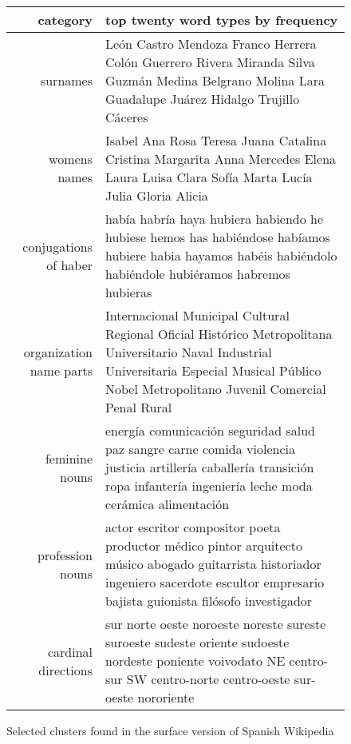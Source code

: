 \begin{figure*}[t!]
  \begin{tabular}{|r|p{10cm}|}
    \hline
    category  & top twenty word types by frequency \\
    \hline
    surnames & León Castro Mendoza Franco Herrera Colón Guerrero Rivera Miranda
    Silva Guzmán Medina Belgrano Molina Lara Guadalupe Juárez Hidalgo Trujillo
    Cáceres \\
    \hline
    womens names & Isabel Ana Rosa Teresa Juana Catalina Cristina Margarita
    Anna Mercedes Elena Laura Luisa Clara Sofía Marta Lucía Julia Gloria Alicia
    \\
    \hline
    conjugations of haber & había habría haya hubiera habiendo he hubiese hemos
    has habiéndose habíamos hubiere habia hayamos habéis habiéndolo habiéndole
    hubiéramos habremos hubieras \\
    \hline
    organization name parts & Internacional Municipal Cultural Regional
    Oficial Histórico Metropolitana Universitario Naval Industrial
    Universitaria Especial Musical Público Nobel Metropolitano Juvenil
    Comercial Penal Rural \\
    \hline
    feminine nouns & energía comunicación seguridad salud paz sangre carne
    comida violencia justicia artillería caballería transición ropa infantería
    ingeniería leche moda cerámica alimentación \\
    \hline
    profession nouns & actor escritor compositor poeta productor médico pintor
    arquitecto músico abogado guitarrista historiador ingeniero sacerdote
    escultor empresario bajista guionista filósofo investigador \\
    \hline
    cardinal directions & sur norte oeste noroeste noreste sureste suroeste
    sudeste oriente sudoeste nordeste poniente voivodato NE centro-sur SW
    centro-norte centro-oeste sur-oeste nororiente \\
    \hline
  \end{tabular}
\caption{Selected clusters found in the surface version of Spanish Wikipedia}
\label{fig:clusters-wikipedia-surface}
\end{figure*}

